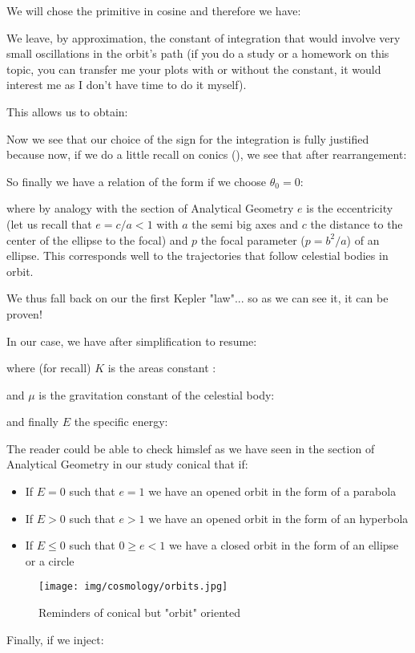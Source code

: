 	We will chose the primitive in cosine and therefore we have:
	
	We leave, by approximation, the constant of integration that would involve very small oscillations in the orbit's path (if you do a study or a homework on this topic, you can transfer me your plots with or without the constant, it would interest me as I don't  have time to do it myself).

	This allows us to obtain:
	
	Now we see that our choice of the sign for the integration is fully justified because now, if we do a little recall on conics (), we see that after rearrangement:
	
	So finally we have a relation of the form if we choose $\theta_0=0$:
	
	where by analogy with the section of Analytical Geometry $e$ is the eccentricity (let us recall that $e=c/a<1$ with $a$ the semi big axes and $c$ the distance to the center of the ellipse to the focal) and $p$ the focal parameter ($p=b^2/a$) of an ellipse. This corresponds well to the trajectories that follow celestial bodies in orbit.
	
	We thus fall back on our the first  Kepler "law"... so as we can see it, it can be proven!

	In our case, we have after simplification to resume:
	
	where (for recall) $K$ is the areas constant :
	
	and $\mu$ is the gravitation constant of the celestial body:
	
	and finally $E$ the specific energy:
	
	The reader could be able to check himslef as we have seen in the section of Analytical Geometry in our study conical that if:
	\begin{itemize}
		\item If $E=0$ such that $e=1$ we have an opened orbit in the form of a parabola

		\item If $E>0$ such that $e>1$ we have an opened orbit in the form of an hyperbola

		\item If $E\leq 0$ such that $0\geq e <1$ we have a closed orbit in the form of an ellipse or a circle
	\end{itemize}
	\begin{figure}[H]
		\begin{center}
		\texttt{[image: img/cosmology/orbits.jpg]}
		\end{center}	
		\caption[]{Reminders of conical but "orbit" oriented}
	\end{figure}
	Finally, if we inject:
	
